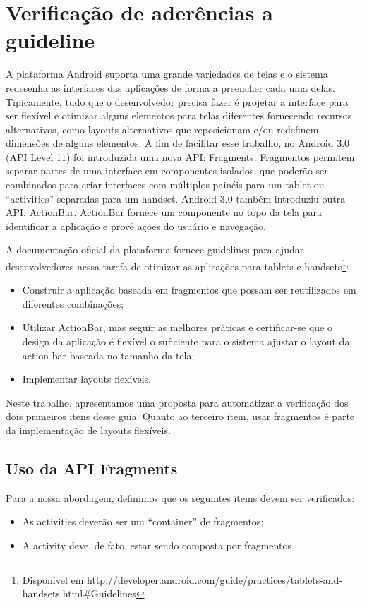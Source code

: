 \chapter{Verificação de aderências a guideline}

A plataforma Android suporta uma grande variedades de telas e o sistema redesenha
as interfaces das aplicações de forma a preencher cada uma delas. Tipicamente, 
tudo que o desenvolvedor precisa fazer é projetar a interface para ser flexível 
e otimizar alguns elementos para telas diferentes fornecendo recursos alternativos, 
como layouts alternativos que reposicionam e/ou redefinem dimensões de alguns 
elementos. A fim de facilitar esse trabalho, no Android 3.0 (API Level 11) foi 
introduzida uma nova API: Fragments. Fragmentos permitem separar partes de uma 
interface em componentes isolados, que poderão ser combinados para criar interfaces 
com múltiplos painéis para um tablet ou “activities” separadas para um handset. 
Android 3.0 também introduziu outra API: ActionBar. ActionBar fornece um componente 
no topo da tela para identificar a aplicação e provê ações do usuário e navegação.

A documentação oficial da plataforma fornece guidelines para ajudar desenvolvedores
nessa tarefa de otimizar as aplicações para tablets e handsets\footnote{Disponível 
em http://developer.android.com/guide/practices/tablets-and-handsets.html\#Guidelines}:

\begin{itemize}
    \item{Construir a aplicação baseada em fragmentos que possam ser reutilizados 
    em diferentes combinações;}
    \item{Utilizar ActionBar, mas seguir as melhores práticas e certificar-se que 
    o design da aplicação é flexível o suficiente para o sistema ajustar o layout 
    da action bar baseada no tamanho da tela;}
    \item{Implementar layouts flexíveis.}
\end{itemize}

Neste trabalho, apresentamos uma proposta para automatizar a verificação dos dois 
primeiros itens desse guia. Quanto ao terceiro item, usar fragmentos é parte da
implementação de layouts flexíveis.

\section{Uso da API Fragments}
\label{uso_fragments}
Para a nossa abordagem, definimos que os seguintes items devem ser verificados: 
\begin{itemize}
    \item{As activities deverão ser um “container” de fragmentos;}
    \item{A activity deve, de fato, estar sendo composta por fragmentos}
\end{itemize}


